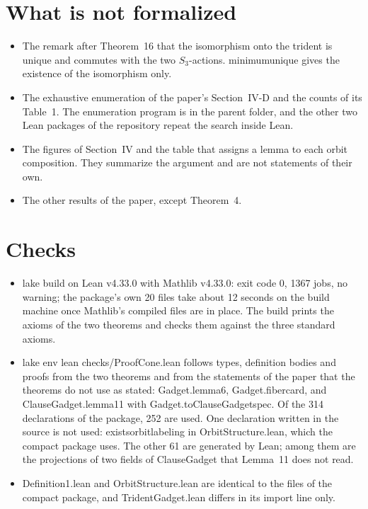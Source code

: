 \documentclass[11pt,a4paper]{article}
\newcommand{\leanus}{\textunderscore\allowbreak}
\newcommand{\lean}[1]{{\ttfamily\let\_\leanus #1}}
\begin{document}
\section{What is not formalized}\label{sec:gaps}

\begin{itemize}
\item The remark after Theorem~16 that the isomorphism onto the trident is
unique and commutes with the two $S_3$-actions. \lean{minimum\_unique} gives
the existence of the isomorphism only.
\item The exhaustive enumeration of the paper's Section~IV-D and the counts
of its Table~1. The enumeration program is in the parent folder, and the
other two Lean packages of the repository repeat the search inside Lean.
\item The figures of Section~IV and the table that assigns a lemma to each
orbit composition. They summarize the argument and are not statements of
their own.
\item The other results of the paper, except Theorem~4.
\end{itemize}

\section{Checks}\label{sec:checks}

\begin{itemize}
\item \lean{lake build} on Lean v4.33.0 with Mathlib v4.33.0: exit code 0,
1367 jobs, no warning; the package's own 20 files take
about 12 seconds on the build machine once Mathlib's compiled files are in
place. The build prints the axioms of the two theorems and checks them
against the three standard axioms.
\item \lean{lake env lean checks/ProofCone.lean} follows types, definition
bodies and proofs from the two theorems and from the statements of the paper
that the theorems do not use as stated: \lean{Gadget.lemma6},
\lean{Gadget.fiber\_card}, and \lean{ClauseGadget.lemma11} with
\lean{Gadget.toClauseGadget\_spec}. Of the 314 declarations of the
package, 252 are used. One declaration written in the source is not
used: \lean{exists\_orbit\_labeling} in \lean{OrbitStructure.lean}, which the
compact package uses. The other 61 are generated by Lean; among them
are the projections of two fields of \lean{ClauseGadget} that Lemma~11 does
not read.
\item \lean{Definition1.lean} and \lean{OrbitStructure.lean} are identical to
the files of the compact package, and \lean{TridentGadget.lean} differs in
its import line only.
\end{itemize}
\end{document}
